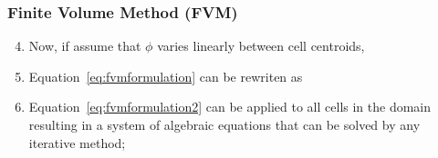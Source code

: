 \documentclass[10pt,compress,handout,ignorenonframetext]{beamer}
\begin{document}
\begin{frame}
 \frametitle{Finite Volume Method (FVM)} 

\begin{enumerate}
   \setcounter{enumi}{3}
     \item <1-> Now, if assume that $\phi$ varies linearly between cell centroids,
     \item <2-> Equation~\ref{eq:fvmformulation} can be rewriten as
     \item <3-> Equation~\ref{eq:fvmformulation2} can be applied to all cells in the domain resulting in a system of algebraic equations that can be solved by any iterative method;
      
\end{enumerate}  
 
\end{frame}
\end{document}
